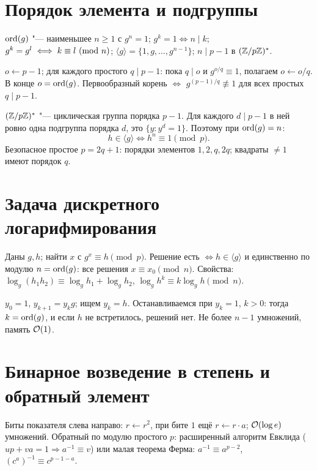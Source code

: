 \documentclass{ca-handout}
\begin{document}
\makehandouttitle

\section{Порядок элемента и подгруппы}
$\operatorname{ord}(g)$ "--- наименьшее $n \ge 1$ с $g^n = 1$; $g^k = 1 \iff n \mid k$; $g^k = g^l \iff
k \equiv l\ (\mathrm{mod}\ n)$; $\langle g \rangle = \{1, g, \dots, g^{n-1}\}$; $n \mid p - 1$ в $\Znx{p}$.

\begin{reminder}[title={Последовательное снижение порядка в $\Znx{p}$}]
$o \gets p - 1$; для каждого простого $q \mid p - 1$: пока $q \mid o$ и $g^{o/q} \equiv 1$, полагаем
$o \gets o/q$. В конце $o = \operatorname{ord}(g)$. Первообразный корень $\iff$ $g^{(p-1)/q} \not\equiv 1$ для всех
простых $q \mid p - 1$.
\end{reminder}

$\Znx{p}$ "--- циклическая группа порядка $p - 1$. Для каждого $d \mid p - 1$ в ней ровно одна подгруппа
порядка $d$, это $\{y : y^d = 1\}$. Поэтому при $\operatorname{ord}(g) = n$:
\[
  h \in \langle g \rangle \iff h^n \equiv 1 \pmod p .
\]
Безопасное простое $p = 2q + 1$: порядки элементов $1, 2, q, 2q$; квадраты $\ne 1$ имеют порядок $q$.

\section{Задача дискретного логарифмирования}
Даны $g, h$; найти $x$ с $g^x \equiv h \pmod p$. Решение есть $\iff h \in \langle g \rangle$ и
единственно по модулю $n = \operatorname{ord}(g)$: все решения $x \equiv x_0 \pmod n$.
Свойства: $\log_g(h_1 h_2) \equiv \log_g h_1 + \log_g h_2$, $\log_g h^k \equiv k \log_g h \pmod n$.

\begin{reminder}[title={Перебор (тривиальный алгоритм)}]
$y_0 = 1$, $y_{k+1} = y_k g$; ищем $y_k = h$. Останавливаемся при $y_k = 1$, $k > 0$: тогда
$k = \operatorname{ord}(g)$, и если $h$ не встретилось, решений нет. Не более $n - 1$ умножений, память $\mathcal{O}(1)$.
\end{reminder}

\section{Бинарное возведение в степень и обратный элемент}
Биты показателя слева направо: $r \gets r^2$, при бите $1$ ещё $r \gets r \cdot a$; $\mathcal{O}(\log e)$
умножений. Обратный по модулю простого $p$: расширенный алгоритм Евклида ($u p + v a = 1 \Rightarrow
a^{-1} \equiv v$) или малая теорема Ферма: $a^{-1} \equiv a^{p-2}$, $(c^a)^{-1} \equiv c^{p-1-a}$.
\end{document}
